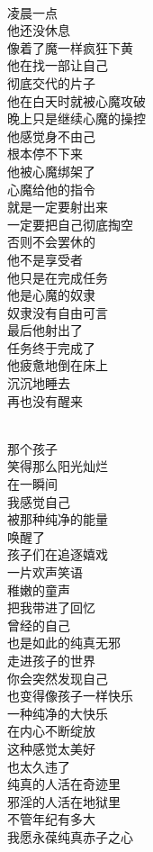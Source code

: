 \begin{poem}[完成任务的撸者]
    \begin{multicols}{2}
        \centering~\\
        凌晨一点 \\ 他还没休息 \\ 像着了魔一样疯狂下黄 \\ 他在找一部让自己 \\ 彻底交代的片子 \\ 他在白天时就被心魔攻破 \\ 晚上只是继续心魔的操控 \\ 他感觉身不由己 \\ 根本停不下来 \\ 他被心魔绑架了 \\ 心魔给他的指令 \\ 就是一定要射出来 \\ 一定要把自己彻底掏空 \\ 否则不会罢休的 \\ 他不是享受者 \\ 他只是在完成任务 \\ 他是心魔的奴隶 \\ 奴隶没有自由可言 \\ 最后他射出了 \\ 任务终于完成了 \\ 他疲惫地倒在床上 \\ 沉沉地睡去 \\ 再也没有醒来
    \end{multicols}
\end{poem}

\begin{poem}[依旧纯真]
    \begin{multicols}{2}
        \centering~\\
        那个孩子 \\ 笑得那么阳光灿烂 \\ 在一瞬间 \\ 我感觉自己 \\ 被那种纯净的能量 \\ 唤醒了 \\ 孩子们在追逐嬉戏 \\ 一片欢声笑语 \\ 稚嫩的童声 \\ 把我带进了回忆 \\ 曾经的自己 \\ 也是如此的纯真无邪 \\ 走进孩子的世界 \\ 你会突然发现自己 \\ 也变得像孩子一样快乐 \\ 一种纯净的大快乐 \\ 在内心不断绽放 \\ 这种感觉太美好 \\ 也太久违了 \\ 纯真的人活在奇迹里 \\ 邪淫的人活在地狱里 \\ 不管年纪有多大 \\ 我愿永葆纯真赤子之心
    \end{multicols}
\end{poem}

